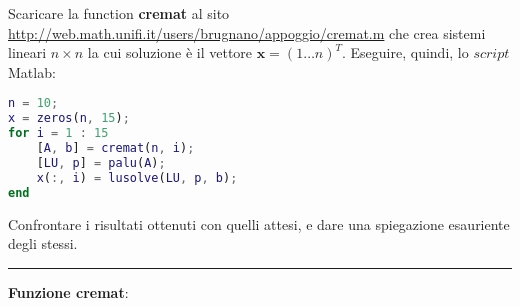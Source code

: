 Scaricare la function \textbf{cremat} al sito
\url{http://web.math.unifi.it/users/brugnano/appoggio/cremat.m}
che crea sistemi lineari $n \times n$ la cui soluzione è il vettore $\textbf{x}=(1 \dots n)^{T}$.
Eseguire, quindi, lo $script$ Matlab:
\begin{lstlisting}[language=Matlab]
n = 10;
x = zeros(n, 15);
for i = 1 : 15
    [A, b] = cremat(n, i);
    [LU, p] = palu(A);
    x(:, i) = lusolve(LU, p, b);
end
\end{lstlisting}
Confrontare i risultati ottenuti con quelli attesi, e dare una spiegazione esauriente degli stessi.

\hspace*{\fill}
\par\noindent\rule{\textwidth}{0.4pt}
\hspace*{\fill}

\textbf{Funzione cremat}:


